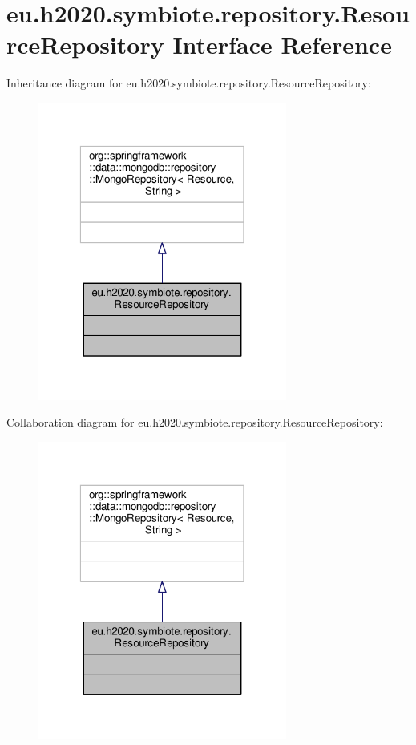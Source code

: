\hypertarget{interfaceeu_1_1h2020_1_1symbiote_1_1repository_1_1ResourceRepository}{}\section{eu.\+h2020.\+symbiote.\+repository.\+Resource\+Repository Interface Reference}
\label{interfaceeu_1_1h2020_1_1symbiote_1_1repository_1_1ResourceRepository}


Inheritance diagram for eu.\+h2020.\+symbiote.\+repository.\+Resource\+Repository\+:
\nopagebreak
\begin{figure}[H]
\begin{center}
\leavevmode
\includegraphics[width=232pt]{interfaceeu_1_1h2020_1_1symbiote_1_1repository_1_1ResourceRepository__inherit__graph}
\end{center}
\end{figure}


Collaboration diagram for eu.\+h2020.\+symbiote.\+repository.\+Resource\+Repository\+:
\nopagebreak
\begin{figure}[H]
\begin{center}
\leavevmode
\includegraphics[width=232pt]{interfaceeu_1_1h2020_1_1symbiote_1_1repository_1_1ResourceRepository__coll__graph}
\end{center}
\end{figure}


